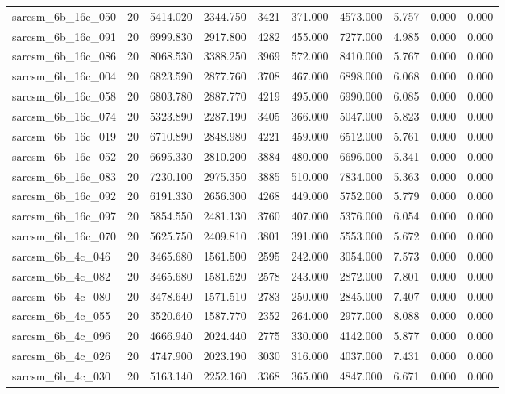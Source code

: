 \begin{tabular}{lrrrrrrrrr}
sarcsm\_6b\_16c\_050 & 20 & 5414.020 & 2344.750 & 3421 & 371.000 & 4573.000 & 5.757 & 0.000 & 0.000 \\
sarcsm\_6b\_16c\_091 & 20 & 6999.830 & 2917.800 & 4282 & 455.000 & 7277.000 & 4.985 & 0.000 & 0.000 \\
sarcsm\_6b\_16c\_086 & 20 & 8068.530 & 3388.250 & 3969 & 572.000 & 8410.000 & 5.767 & 0.000 & 0.000 \\
sarcsm\_6b\_16c\_004 & 20 & 6823.590 & 2877.760 & 3708 & 467.000 & 6898.000 & 6.068 & 0.000 & 0.000 \\
sarcsm\_6b\_16c\_058 & 20 & 6803.780 & 2887.770 & 4219 & 495.000 & 6990.000 & 6.085 & 0.000 & 0.000 \\
sarcsm\_6b\_16c\_074 & 20 & 5323.890 & 2287.190 & 3405 & 366.000 & 5047.000 & 5.823 & 0.000 & 0.000 \\
sarcsm\_6b\_16c\_019 & 20 & 6710.890 & 2848.980 & 4221 & 459.000 & 6512.000 & 5.761 & 0.000 & 0.000 \\
sarcsm\_6b\_16c\_052 & 20 & 6695.330 & 2810.200 & 3884 & 480.000 & 6696.000 & 5.341 & 0.000 & 0.000 \\
sarcsm\_6b\_16c\_083 & 20 & 7230.100 & 2975.350 & 3885 & 510.000 & 7834.000 & 5.363 & 0.000 & 0.000 \\
sarcsm\_6b\_16c\_092 & 20 & 6191.330 & 2656.300 & 4268 & 449.000 & 5752.000 & 5.779 & 0.000 & 0.000 \\
sarcsm\_6b\_16c\_097 & 20 & 5854.550 & 2481.130 & 3760 & 407.000 & 5376.000 & 6.054 & 0.000 & 0.000 \\
sarcsm\_6b\_16c\_070 & 20 & 5625.750 & 2409.810 & 3801 & 391.000 & 5553.000 & 5.672 & 0.000 & 0.000 \\
sarcsm\_6b\_4c\_046 & 20 & 3465.680 & 1561.500 & 2595 & 242.000 & 3054.000 & 7.573 & 0.000 & 0.000 \\
sarcsm\_6b\_4c\_082 & 20 & 3465.680 & 1581.520 & 2578 & 243.000 & 2872.000 & 7.801 & 0.000 & 0.000 \\
sarcsm\_6b\_4c\_080 & 20 & 3478.640 & 1571.510 & 2783 & 250.000 & 2845.000 & 7.407 & 0.000 & 0.000 \\
sarcsm\_6b\_4c\_055 & 20 & 3520.640 & 1587.770 & 2352 & 264.000 & 2977.000 & 8.088 & 0.000 & 0.000 \\
sarcsm\_6b\_4c\_096 & 20 & 4666.940 & 2024.440 & 2775 & 330.000 & 4142.000 & 5.877 & 0.000 & 0.000 \\
sarcsm\_6b\_4c\_026 & 20 & 4747.900 & 2023.190 & 3030 & 316.000 & 4037.000 & 7.431 & 0.000 & 0.000 \\
sarcsm\_6b\_4c\_030 & 20 & 5163.140 & 2252.160 & 3368 & 365.000 & 4847.000 & 6.671 & 0.000 & 0.000 \\

\end{tabular}
